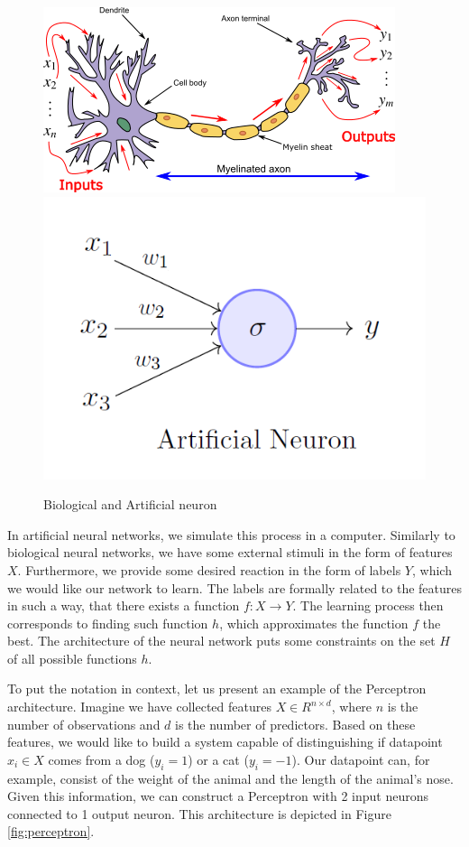 \begin{figure}
    \centering
    \includegraphics[width=0.5\linewidth]{imgs_andy/biological_neuron.png}
    \includegraphics[width=0.5\linewidth]{imgs_andy/artificial_neuron.png}
    \caption{Biological  and Artificial neuron}
    \label{fig:neurons_comparison}
\end{figure}

In artificial neural networks, we simulate this process in a computer.
Similarly to biological neural networks, we have some external stimuli in the form of features $X$.
Furthermore, we provide some desired reaction in the form of labels $Y$, which we would like our network to learn.
The labels are formally related to the features in such a way, that there exists a function $f: X \to Y$.
The learning process then corresponds to finding such function $h$, which approximates the function $f$ the best.
The architecture of the neural network puts some constraints on the set $H$ of all possible functions $h$.

To put the notation in context, let us present an example of the Perceptron architecture.
Imagine we have collected features $X \in R^{n \times d}$, where $n$ is the number of observations and $d$ is the number of predictors.
Based on these features, we would like to build a system capable of distinguishing if datapoint $x_i \in X$ comes from a dog ($y_i = 1$) or a cat ($y_i = -1$).
Our datapoint can, for example, consist of the weight of the animal and the length of the animal's nose.
Given this information, we can construct a Perceptron with 2 input neurons connected to 1 output neuron.
This architecture is depicted in Figure \ref{fig:perceptron}.

